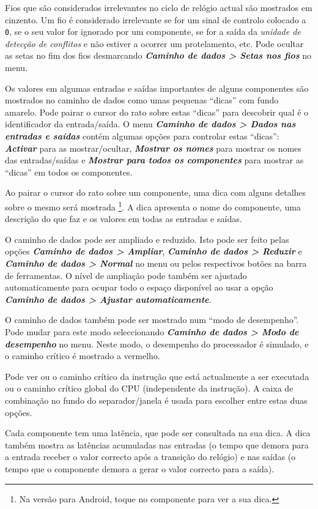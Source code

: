 \documentclass[11pt,a4paper,twoside,titlepage]{report}
\newcommand{\menupath}[1]{\textbf{\emph{#1}}}
\begin{document}
Fios que são considerados irrelevantes no ciclo de relógio actual são 
mostrados em cinzento.
Um fio é considerado irrelevante se for um sinal de controlo colocado a
\verb+0+, se o seu valor for ignorado por um componente, se for a saída da
\emph{unidade de detecção de conflitos} e não estiver a ocorrer um
protelamento, etc.
Pode ocultar as setas no fim dos fios desmarcando
\menupath{Caminho de dados > Setas nos fios} no menu.

Os valores em algumas entradas e saídas importantes de alguns componentes são
mostrados no caminho de dados como umas pequenas ``dicas'' com 
fundo amarelo.
Pode pairar o cursor do rato sobre estas ``dicas'' para descobrir qual é o
identificador da entrada/saída.
O menu \menupath{Caminho de dados > Dados nas entradas e saídas} contém algumas
opções para controlar estas ``dicas'': \menupath{Activar} para as mostrar/ocultar,
\menupath{Mostrar os nomes} para mostrar os nomes das entradas/saídas e
\menupath{Mostrar para todos os componentes} para mostrar as ``dicas'' em todos
os componentes.

Ao pairar o cursor do rato sobre um componente, uma dica com alguns detalhes
sobre o mesmo será mostrada \footnote{Na versão para Android, toque no
componente para ver a sua dica.}.
A dica apresenta o nome do componente, uma descrição do que faz e os valores
em todas as entradas e saídas.

O caminho de dados pode ser ampliado e reduzido. Isto pode ser feito pelas
opções \menupath{Caminho de dados > Ampliar},
\menupath{Caminho de dados > Reduzir} e \menupath{Caminho de dados > Normal}
no menu ou pelos respectivos botões na barra de ferramentas.
O nível de ampliação pode também ser ajustado automaticamente para ocupar todo
o espaço disponível ao usar a opção
\menupath{Caminho de dados > Ajustar automaticamente}.

\bigskip

O caminho de dados também pode ser mostrado num ``modo de desempenho''.
Pode mudar para este modo seleccionando 
\menupath{Caminho de dados > Modo de desempenho} no menu.
Neste modo, o desempenho do processador é simulado, e o caminho crítico
é mostrado a vermelho.

Pode ver ou o caminho crítico da instrução que está actualmente a ser
executada ou o caminho crítico global do CPU (independente da instrução).
A caixa de combinação no fundo do separador/janela é usada para escolher
entre estas duas opções.

Cada componente tem uma latência, que pode ser consultada na sua dica.
A dica também mostra as latências acumuladas nas entradas (o tempo que
demora para a entrada receber o valor correcto após a transição do relógio)
e nas saídas (o tempo que o componente demora a gerar o valor correcto para
a saída).
\end{document}
